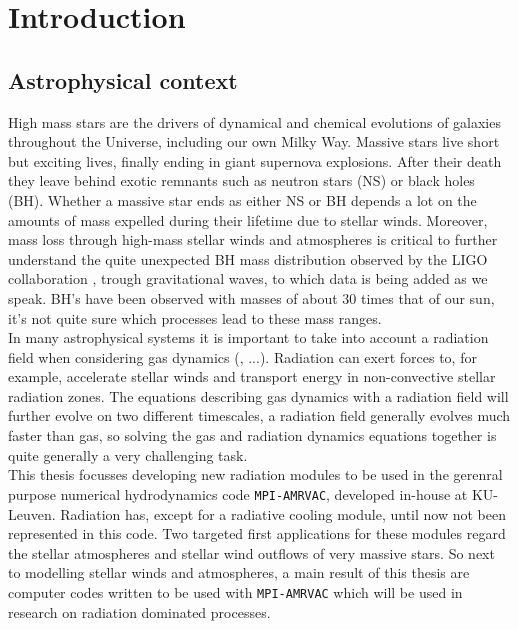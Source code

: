 \chapter{Introduction}
\section{Astrophysical context}
High mass stars are the drivers of dynamical and chemical evolutions of galaxies throughout the Universe, including our own Milky Way. Massive stars live short but exciting lives, finally ending in giant supernova explosions. After their death they leave behind exotic remnants such as neutron stars (NS) or black holes (BH). Whether a massive star ends as either NS or BH depends a lot on the amounts of mass expelled during their lifetime due to stellar winds. Moreover, mass loss through high-mass stellar winds and atmospheres is critical to further understand the quite unexpected BH mass distribution observed by the LIGO collaboration \citep{TheLIGOScientificCollaboration2016}, \citep{Abbott1} trough gravitational waves, to which data is being added as we speak. BH's have been observed with masses of about $30$ times that of our sun, it's not quite sure which processes lead to these mass ranges.\\

In many astrophysical systems it is important to take into account a radiation field when considering gas dynamics (\citep{Tetsu2016},  ...). Radiation can exert forces to, for example, accelerate stellar winds and transport energy in non-convective stellar radiation zones. The equations describing gas dynamics with a radiation field will further evolve on two different timescales, a radiation field generally evolves much faster than gas, so solving the gas and radiation dynamics equations together is quite generally a very challenging task. \\

This thesis focusses developing new radiation modules to be used in the gerenral purpose numerical hydrodynamics code \texttt{MPI-AMRVAC}, developed in-house at KU-Leuven. Radiation has, except for a radiative cooling module, until now not been represented in this code. Two targeted first applications for these modules regard the stellar atmospheres and stellar wind outflows of very massive stars. So next to modelling stellar winds and atmospheres, a main result of this thesis are computer codes written to be used with \texttt{MPI-AMRVAC} which will be used in research on radiation dominated processes.\\

